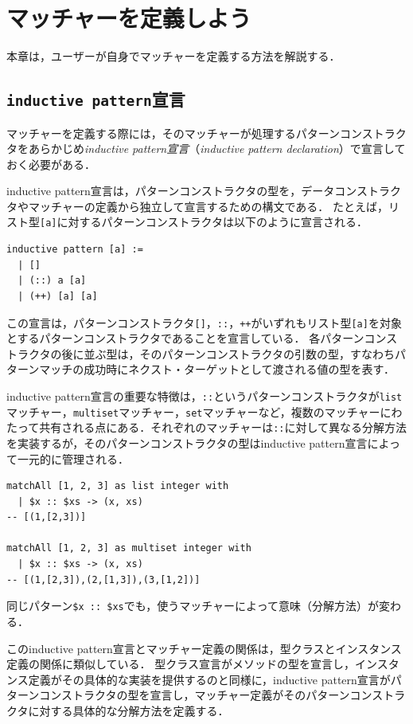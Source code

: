 \chapter{マッチャーを定義しよう}\label{matcher}

本章は，ユーザーが自身でマッチャーを定義する方法を解説する．　

\section{\texttt{inductive pattern}宣言}\label{matcher-inductive}

マッチャーを定義する際には，そのマッチャーが処理するパターンコンストラクタをあらかじめ\emph{inductive pattern宣言}（\emph{inductive pattern declaration}）で宣言しておく必要がある．

inductive pattern宣言は，パターンコンストラクタの型を，データコンストラクタやマッチャーの定義から独立して宣言するための構文である．
たとえば，リスト型\lstinline{[a]}に対するパターンコンストラクタは以下のように宣言される．
\begin{lstlisting}[language=egison]
inductive pattern [a] :=
  | []
  | (::) a [a]
  | (++) [a] [a]
\end{lstlisting}
この宣言は，パターンコンストラクタ\lstinline{[]}，\lstinline{::}，\lstinline{++}がいずれもリスト型\lstinline{[a]}を対象とするパターンコンストラクタであることを宣言している．
各パターンコンストラクタの後に並ぶ型は，そのパターンコンストラクタの引数の型，すなわちパターンマッチの成功時にネクスト・ターゲットとして渡される値の型を表す．

inductive pattern宣言の重要な特徴は，\lstinline{::}というパターンコンストラクタが\lstinline{list}マッチャー，\lstinline{multiset}マッチャー，\lstinline{set}マッチャーなど，複数のマッチャーにわたって共有される点にある．それぞれのマッチャーは\lstinline{::}に対して異なる分解方法を実装するが，そのパターンコンストラクタの型はinductive pattern宣言によって一元的に管理される．
\begin{lstlisting}[language=egison,numbers=none]
matchAll [1, 2, 3] as list integer with
  | $x :: $xs -> (x, xs)
-- [(1,[2,3])]

matchAll [1, 2, 3] as multiset integer with
  | $x :: $xs -> (x, xs)
-- [(1,[2,3]),(2,[1,3]),(3,[1,2])]
\end{lstlisting}
同じパターン\lstinline{$x :: $xs}でも，使うマッチャーによって意味（分解方法）が変わる．

このinductive pattern宣言とマッチャー定義の関係は，型クラスとインスタンス定義の関係に類似している．
型クラス宣言がメソッドの型を宣言し，インスタンス定義がその具体的な実装を提供するのと同様に，inductive pattern宣言がパターンコンストラクタの型を宣言し，マッチャー定義がそのパターンコンストラクタに対する具体的な分解方法を定義する．

